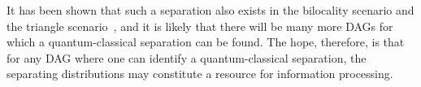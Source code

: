 It has been shown that such a separation also exists 
in the bilocality scenario \cite{BilocalCorrelations,fritz2012bell} and the triangle scenario~\cite{fritz2012bell}, and it is likely that there will be many more DAGs for which a quantum-classical separation can be found.  The hope, therefore, is that for any DAG where one can identify a quantum-classical separation, the separating distributions may constitute a resource for information processing. 



